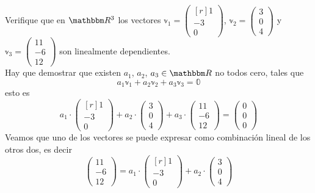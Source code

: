 \begin{example}
    Verifique que en $\RR[3]$ los vectores $\displaystyle \mathbb{v}_1 = \begin{pmatrix*}[r] 1 \\ -3 \\ 0 \end{pmatrix*}$, $\displaystyle \mathbb{v}_2 = \begin{pmatrix} 3 \\ 0 \\ 4 \end{pmatrix}$ y $\displaystyle \mathbb{v}_3 = \begin{pmatrix} 11 \\ -6 \\ 12 \end{pmatrix}$ son linealmente dependientes. \\
    \solucion Hay que demostrar que existen $a_1$, $a_2$, $a_3 \in \RR$ no todos cero, tales que
    $$a_1\mathbb{v}_1 + a_2\mathbb{v}_2 + a_3\mathbb{v}_3 = \mathbb{0}$$
    esto es
    \begin{equation}
        a_1 \cdot \begin{pmatrix*}[r] 1 \\ -3 \\ 0 \end{pmatrix*} + a_2 \cdot \begin{pmatrix} 3 \\ 0 \\ 4 \end{pmatrix} + a_3 \cdot \begin{pmatrix} 11 \\ -6 \\ 12 \end{pmatrix} = \begin{pmatrix} 0 \\ 0 \\ 0 \end{pmatrix} \label{ec22}
    \end{equation}
    Veamos que uno de los vectores se puede expresar como combinación lineal de los otros dos, es decir
    $$\begin{pmatrix} 11 \\ -6 \\ 12 \end{pmatrix} = a_1 \cdot \begin{pmatrix*}[r] 1 \\ -3 \\ 0 \end{pmatrix*} + a_2 \cdot \begin{pmatrix} 3 \\ 0 \\ 4 \end{pmatrix}$$

\end{example}
